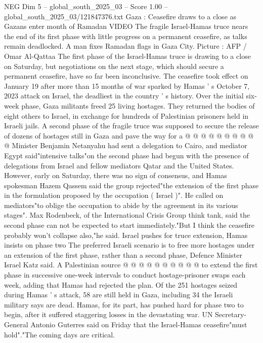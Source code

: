 \begin{textsample}{NEG Dim 5 – global\_south\_2025\_03 – Score 1.00 – global\_south\_2025\_03/121847376.txt}  \label{ex:f5_neg_262}
Gaza : Ceasefire draws to a close as Gazans enter month of Ramadan VIDEO The fragile Israel-Hamas truce nears the end of its first phase with little progress on a permanent ceasefire, as talks remain deadlocked.
A man fixes Ramadan flags in Gaza City.
Picture : AFP / Omar Al-Qattaa The first phase of the Israel-Hamas truce is drawing to a close on Saturday, but negotiations on the next stage, which should secure a permanent ceasefire, have so far been inconclusive.
The ceasefire took effect on January 19 after more than 15 months of war sparked by Hamas ' s October 7, 2023 attack on Israel, the deadliest in the country ' s history.
Over the initial six-week phase, Gaza militants freed 25 living hostages.
They returned the bodies of eight others to Israel, in exchange for hundreds of Palestinian prisoners held in Israeli jails.
A second phase of the fragile truce was supposed to secure the release of dozens of hostages still in Gaza and pave the way for a @ @ @ @ @ @ @ @ @ @ Minister Benjamin Netanyahu had sent a delegation to Cairo, and mediator Egypt said"intensive talks"on the second phase had begun with the presence of delegations from Israel and fellow mediators Qatar and the United States.
However, early on Saturday, there was no sign of consensus, and Hamas spokesman Hazem Qassem said the group rejected"the extension of the first phase in the formulation proposed by the occupation ( Israel )".
He called on mediators"to oblige the occupation to abide by the agreement in its various stages".
Max Rodenbeck, of the International Crisis Group think tank, said the second phase can not be expected to start immediately."But I think the ceasefire probably won't collapse also,"he said.
Israel pushes for truce extension, Hamas insists on phase two The preferred Israeli scenario is to free more hostages under an extension of the first phase, rather than a second phase, Defence Minister Israel Katz said.
A Palestinian source @ @ @ @ @ @ @ @ @ @ to extend the first phase in successive one-week intervals to conduct hostage-prisoner swaps each week, adding that Hamas had rejected the plan.
Of the 251 hostages seized during Hamas ' s attack, 58 are still held in Gaza, including 34 the Israeli military says are dead.
Hamas, for its part, has pushed hard for phase two to begin, after it suffered staggering losses in the devastating war.
UN Secretary-General Antonio Guterres said on Friday that the Israel-Hamas ceasefire"must hold"."The coming days are critical.

\end{textsample}

